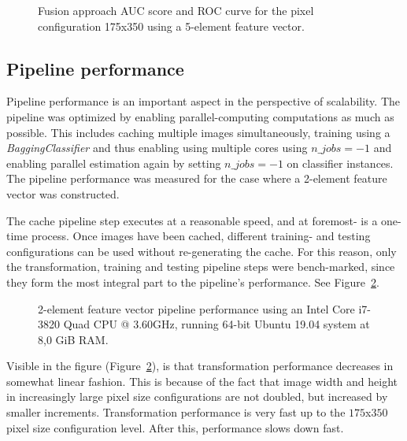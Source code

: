 \begin{figure}[ht]
  \centering
  
  \caption{Fusion approach AUC score and ROC curve for the pixel configuration 175x350 using a 5-element feature vector.
  }\label{fig:5-element-fv-fusion-aucroc}
\end{figure}

\subsection{Pipeline performance}\label{sec:pipeline-performance}
Pipeline performance is an important aspect in the perspective of scalability. The pipeline was optimized by enabling parallel-computing computations as much as possible. This includes caching multiple images simultaneously, training using a \textit{BaggingClassifier} and thus enabling using multiple cores using $n\_jobs=-1$ and enabling parallel estimation again by setting $n\_jobs=-1$ on classifier instances. The pipeline performance was measured for the case where a 2-element feature vector was constructed.

The cache pipeline step executes at a reasonable speed, and at foremost- is a one-time process. Once images have been cached, different training- and testing configurations can be used without re-generating the cache. For this reason, only the transformation, training and testing pipeline steps were bench-marked, since they form the most integral part to the pipeline's performance. See Figure~\ref{fig:pipeline-performance}.

\begin{figure}[ht]
  \centering
  
  \caption{2-element feature vector pipeline performance using an Intel Core i7-3820 Quad CPU @ 3.60GHz, running 64-bit Ubuntu 19.04 system at 8,0 GiB RAM.
  }\label{fig:pipeline-performance}
\end{figure}

Visible in the figure (Figure~\ref{fig:pipeline-performance}), is that transformation performance decreases in somewhat linear fashion. This is because of the fact that image width and height in increasingly large pixel size configurations are not doubled, but increased by smaller increments. Transformation performance is very fast up to the $175$x$350$ pixel size configuration level. After this, performance slows down fast.

